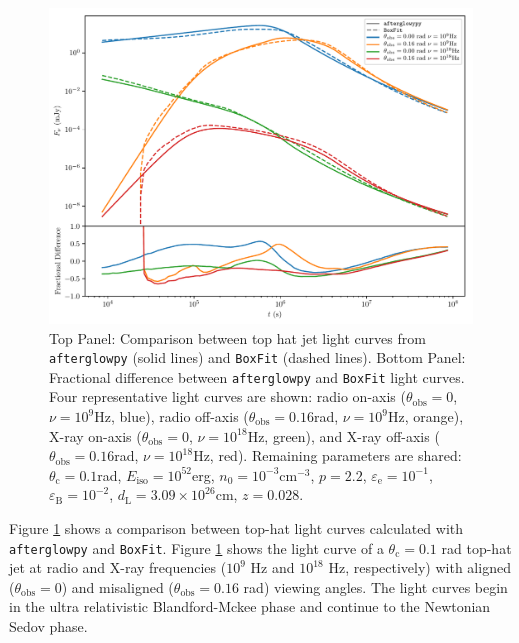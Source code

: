 \documentclass[twocolumn]{aastex62}
\newcommand{\afterglowpy}{{\tt afterglowpy}}
\newcommand{\boxfit}{{\tt BoxFit}}
\newcommand{\thobs}{\ensuremath{\theta_{\mathrm{obs}}}}
\newcommand{\thC}{\ensuremath{\theta_{\mathrm{c}}}}
\newcommand{\epse}{\ensuremath{\varepsilon_{\mathrm{e}}}}
\newcommand{\epsB}{\ensuremath{\varepsilon_{\mathrm{B}}}}
\newcommand{\dL}{\ensuremath{d_{\mathrm{L}}}}
\newcommand{\Eiso}{\ensuremath{E_{\mathrm{iso}}}}
\begin{document}
%
\begin{figure}
	\includegraphics[width=\textwidth]{figs/boxfit_comp.pdf}
	\caption{Top Panel: Comparison between top hat jet light curves from \afterglowpy{} (solid lines) and \boxfit{} (dashed lines). Bottom Panel: Fractional difference between \afterglowpy{} and \boxfit{} light curves.  Four representative light curves are shown: radio on-axis ($\thobs=0$, $\nu=10^9$Hz, blue), radio off-axis ($\thobs=0.16$rad, $\nu=10^9$Hz, orange), X-ray on-axis ($\thobs=0$, $\nu=10^{18}$Hz, green), and X-ray off-axis ($\thobs=0.16$rad, $\nu=10^{18}$Hz, red).  Remaining parameters are shared: $\thC=0.1$rad, $\Eiso=10^{52}$erg, $n_0 = 10^{-3}$cm$^{-3}$, $p=2.2$, $\epse=10^{-1}$, $\epsB=10^{-2}$, $\dL=3.09 \times 10^{26}$cm, $z=0.028$. \label{fig:boxfitComp}}
\end{figure}

Figure \ref{fig:boxfitComp} shows a comparison between top-hat light curves calculated with \afterglowpy{} and \boxfit{}.   Figure \ref{fig:boxfitComp} shows the light curve of a $\thC=0.1$ rad top-hat jet at radio and X-ray frequencies ($10^9$ Hz and $10^{18}$ Hz, respectively) with aligned ($\thobs = 0$) and misaligned ($\thobs=0.16$ rad) viewing angles.  The light curves begin in the ultra relativistic Blandford-Mckee phase and continue to the Newtonian Sedov phase.
\end{document}
